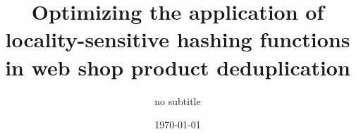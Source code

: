 \documentclass{master_thesis.style}		%
\begin{document}
\frontmatter
\title{Optimizing the application of locality-sensitive hashing functions in web shop product deduplication}
\addresses{\groupname\\\deptname\\\univname}
\date{\today}
\subject{Locality-sensitive hashing}
\subtitle {no subtitle}
% 

\maketitle



\tableofcontents
\listoffigures
\listoftables






\mainmatter

%
%





%
%

\backmatter
\typeout{}




\end{document}

